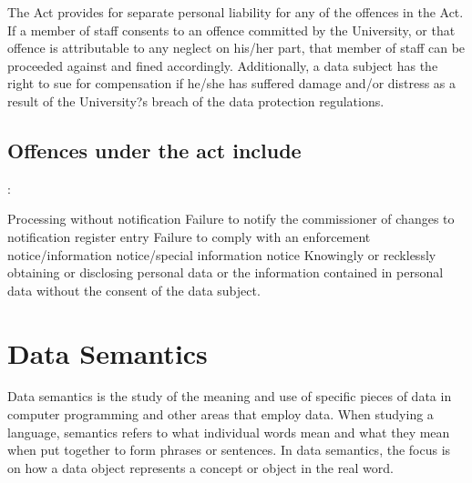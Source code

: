\documentclass[11pt]{article} %
\begin{document}
The Act provides for separate personal liability for any of the offences in the Act. If a member of staff consents to an offence committed by the University, or that offence is attributable to any neglect on his/her part, that member of staff can be proceeded against and fined accordingly. Additionally, a data subject has the right to sue for compensation if he/she has suffered damage and/or distress as a result of the University?s breach of the data protection regulations.

\subsection{Offences under the act include}:

Processing without notification
Failure to notify the commissioner of changes to notification register entry
Failure to comply with an enforcement notice/information notice/special information notice
Knowingly or recklessly obtaining or disclosing personal data or the information contained in personal data without the consent of the data subject.


\newpage







\section{Data Semantics}
Data semantics is the study of the meaning and use of specific pieces of data in computer programming and other areas that employ data. When studying a language, semantics refers to what individual words mean and what they mean when put together to form phrases or sentences. In data semantics, the focus is on how a data object represents a concept or object in the real word.
\end{document}

